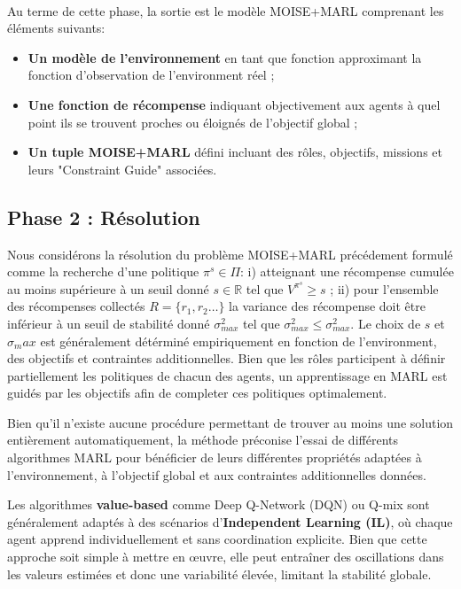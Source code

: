 \documentclass[sigconf,anonymous]{aamas}
\begin{document}
\

Au terme de cette phase, la sortie est le modèle MOISE+MARL comprenant les éléments suivants:
\begin{itemize}
    \item \textbf{Un modèle de l'environnement} en tant que fonction approximant la fonction d'observation de l'environment réel ;
    \item \textbf{Une fonction de récompense} indiquant objectivement aux agents à quel point ils se trouvent proches ou éloignés de l'objectif global ;
    \item \textbf{Un tuple MOISE+MARL} défini incluant des rôles, objectifs, missions et leurs "Constraint Guide" associées.
\end{itemize}

\subsection{Phase 2 : Résolution}

Nous considérons la résolution du problème MOISE+MARL précédement formulé comme la recherche d'une politique $\pi^s \in \Pi$: \quad i) atteignant une récompense cumulée au moins supérieure à un seuil donné $s \in \mathbb{R}$ tel que $V^{\pi^s} \geq s$ ; \quad ii) pour l'ensemble des récompenses collectés $R = \{r_1, r_2\dots\}$ la variance des récompense doit être inférieur à un seuil de stabilité donné $\sigma_{max}^2$ tel que $\sigma_{max}^2 \leq \sigma_{max}^2$. Le choix de $s$ et $\sigma_max$ est généralement détérminé empiriquement en fonction de l'environment, des objectifs et contraintes additionnelles. Bien que les rôles participent à définir partiellement les politiques de chacun des agents, un apprentissage en MARL est guidés par les objectifs afin de completer ces politiques optimalement.

Bien qu'il n'existe aucune procédure permettant de trouver au moins une solution entièrement automatiquement, la méthode préconise l'essai de différents algorithmes MARL pour bénéficier de leurs différentes propriétés adaptées à l'environnement, à l'objectif global et aux contraintes additionnelles données.

Les algorithmes \textbf{value-based} comme Deep Q-Network (DQN) ou Q-mix sont généralement adaptés à des scénarios d'\textbf{Independent Learning (IL)}, où chaque agent apprend individuellement et sans coordination explicite. Bien que cette approche soit simple à mettre en œuvre, elle peut entraîner des oscillations dans les valeurs estimées et donc une variabilité élevée, limitant la stabilité globale.
\end{document}
